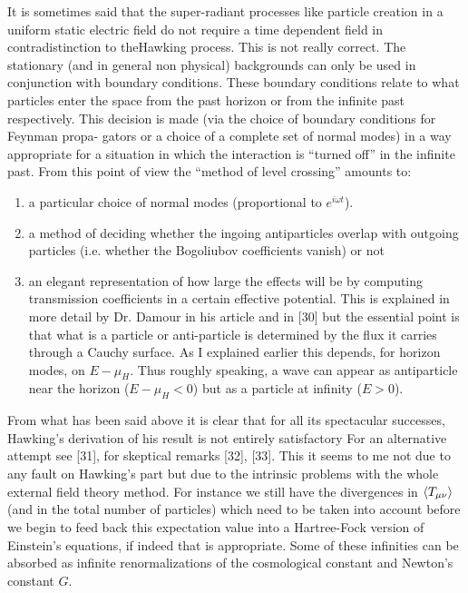 It is sometimes said that the super-radiant processes like particle creation
in a uniform static electric field do not require a time dependent field in
contradistinction to theHawking process. This is not really correct. The stationary
(and in general non physical) backgrounds can only be used in conjunction
with boundary conditions. These boundary conditions relate to what particles
enter the space from the past horizon or from the infinite past respectively.
This decision is made (via the choice of boundary conditions for Feynman propa-
gators or a choice of a complete set of normal modes) in a way appropriate for a
situation in which the interaction is ``turned off'' in the infinite past. From
this point of view the ``method of level crossing'' amounts to:
\begin{enumerate}
\item a particular choice of normal modes (proportional to $e^{i \omega t}$).
\item a method of deciding whether the ingoing antiparticles overlap with
outgoing particles (i.e. whether the Bogoliubov coefficients vanish)
or not
\item an elegant representation of how large the effects will be by computing 
transmission coefficients in a certain effective potential. This
is explained in more detail by Dr. Damour in his article and in [30]
but the essential point is that what is a particle or anti-particle
is determined by the flux it carries through a Cauchy surface.
As I explained earlier this depends, for horizon modes, on $E-\mu_H$.
Thus roughly speaking, a wave can appear as antiparticle near the horizon
($E-\mu_H < 0$) but as a particle at infinity ($E > 0$).
\end{enumerate}

From what has been said above it is clear that for all its spectacular
successes, Hawking's derivation of his result is not entirely satisfactory For
an alternative attempt see [31], for skeptical remarks [32], [33].
This it seems to me not due to any fault on Hawking's part but due to the intrinsic problems
with the whole external field theory method. For instance we still have
the divergences in $\langle T_{\mu\nu} \rangle$ (and in the total number of particles) which need to be
taken into account before we begin to feed back this expectation value into a
Hartree-Fock version of Einstein's equations, if indeed that is appropriate. Some
of these infinities can be absorbed as infinite renormalizations of the cosmological
constant and Newton's constant $G$.



